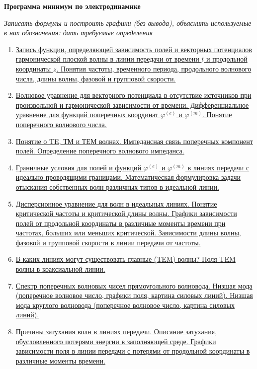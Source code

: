 \documentclass[a4paper,14pt]{extarticle}
\renewcommand{\phi}{\varphi}
\begin{document}
\begin{center}
	\Large \textbf{Программа минимум по электродинамике}
\end{center}
\textit{Записать формулы и построить графики (без вывода), объяснить используемые в них обозначения: дать требуемые определения}

\begin{enumerate}
	\item 
	\hyperlink{num1}{Запись функции, определяющей зависимость полей и векторных потенциалов гармонической плоской волны в линии передачи от времени $t$ и продольной координаты $z$. Понятия частоты, временного периода, продольного волнового числа, длины волны, фазовой и групповой скорости.}
	
	\item 
	\hyperlink{num2}{Волновое уравнение для векторного потенциала в отсутствие источников при произвольной и гармонической зависимости от времени. Дифференциальное уравнение для функций поперечных координат $\phi^{(e)}$ и $\phi^{(m)}$. Понятие поперечного волнового числа.}
	\item 
	\hyperlink{num3}{Понятие о TE, ТМ и ТЕМ волнах. Импедансная связь поперечных компонент полей. Определение поперечного волнового импеданса.}
	\item
	\hyperlink{num4}{Граничные условия для полей и функций  $\phi^{(e)}$ и $\phi^{(m)}$ в линиях передачи с идеально 
	проводящими границами. Математическая формулировка задачи отыскания собственных волн различных типов в идеальной линии.}
	\item 
	\hyperlink{num5}{Дисперсионное уравнение для волн в идеальных линиях. Понятие критической частоты и критической длины волны. Графики зависимости полей от продольной координаты в различные моменты времени при частотах, больших или меньших критической. Зависимости длины волны, фазовой и групповой скорости в линии передачи от частоты.}
	\item
	\hyperlink{num6}{В каких линиях могут существовать главные (TEM) волны? Поля TEM волны в	коаксиальной линии.}
	\item 
	\hyperlink{num7}{Спектр поперечных волновых чисел прямоугольного волновода. Низшая мода (поперечное волновое число, графики поля, картина силовых линий). Низшая мода круглого волновода (поперечное волновое число, картина силовых линий).}
	\item
	\hyperlink{num8}{Причины затухания волн в линиях передачи. Описание затухания, обусловленного потерями энергии в заполняющей среде. Графики зависимости поля в линии передачи с потерями от продольной координаты в различные моменты времени.}

\end{enumerate}
\end{document}
